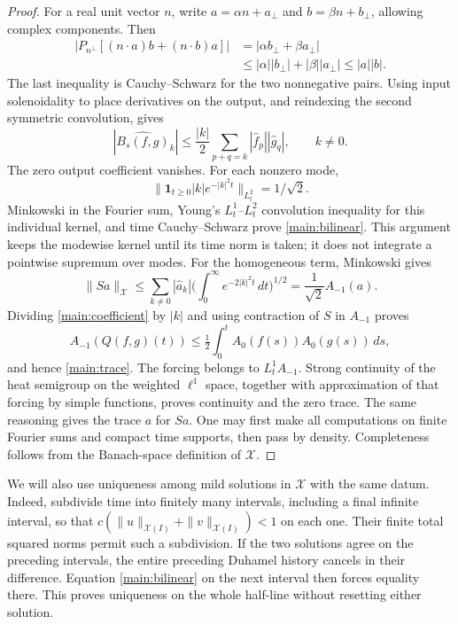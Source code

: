 \begin{proof}
For a real unit vector $n$, write $a=\alpha n+a_\perp$ and
$b=\beta n+b_\perp$, allowing complex components. Then
\begin{align*}
 |P_{n^\perp}[(n\cdot a)b+(n\cdot b)a]|
 &=|\alpha b_\perp+\beta a_\perp|\\
 &\le |\alpha||b_\perp|+|\beta||a_\perp|
 \le |a||b|.
\end{align*}
The last inequality is Cauchy--Schwarz for the two nonnegative pairs.
Using input solenoidality to place derivatives on the output, and
reindexing the second symmetric convolution, gives
\begin{equation}
 |\widehat{B_s(f,g)}_k|
 \le\frac{|k|}{2}\sum_{p+q=k}|\widehat f_p||\widehat g_q|,
 \qquad k\ne0.\label{main:coefficient}
\end{equation}
The zero output coefficient vanishes. For each nonzero mode,
\[
 \big\|\mathbf1_{t\ge0}|k|e^{-|k|^2t}\big\|_{L^2_t}=1/\sqrt2.
\]
Minkowski in the Fourier sum, Young's $L^1_t$--$L^2_t$ convolution
inequality for this individual kernel, and time Cauchy--Schwarz prove
\eqref{main:bilinear}. This argument keeps the modewise kernel until its
time norm is taken; it does not integrate a pointwise supremum over modes.
For the homogeneous term, Minkowski gives
\[
 \|Sa\|_{\mathcal X}
 \le\sum_{k\ne0}|\widehat a_k|
       \bigg(\int_0^\infty e^{-2|k|^2t}\,dt\bigg)^{1/2}
 =\frac1{\sqrt2}A_{-1}(a).
\]
Dividing \eqref{main:coefficient} by $|k|$ and using contraction of $S$
in $A_{-1}$ proves
\[
 A_{-1}(Q(f,g)(t))\le\tfrac12\int_0^t A_0(f(s))A_0(g(s))\,ds,
\]
and hence \eqref{main:trace}. The forcing belongs to $L^1_tA_{-1}$.
Strong continuity of the heat semigroup on the weighted $\ell^1$ space,
together with approximation of that forcing by simple functions, proves
continuity and the zero trace. The same reasoning gives the trace $a$ for
$Sa$. One may first make all computations on finite Fourier sums and
compact time supports, then pass by density. Completeness follows from the
Banach-space definition of $\mathcal X$.
\end{proof}

We will also use uniqueness among mild solutions in $\mathcal X$ with the
same datum. Indeed, subdivide time into finitely many intervals, including
a final infinite interval, so that
$c(\|u\|_{\mathcal X(I)}+\|v\|_{\mathcal X(I)})<1$ on each one.
Their finite total squared norms permit such a subdivision. If the two
solutions agree on the preceding intervals, the entire preceding Duhamel
history cancels in their difference. Equation \eqref{main:bilinear} on the
next interval then forces equality there. This proves uniqueness on the
whole half-line without resetting either solution.

